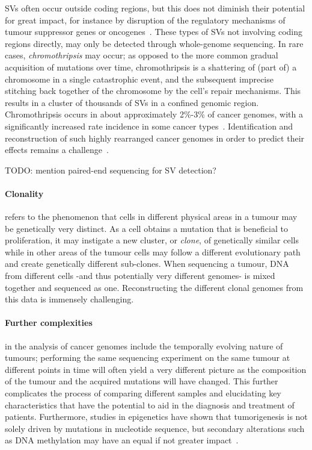 \begin{justify}
SVs often occur outside coding regions, but this does not diminish their potential for great impact, for instance by disruption of the regulatory mechanisms of tumour suppressor genes or oncogenes~\cite{TODO}. These types of SVs not involving coding regions directly, may only be detected through whole-genome sequencing. In rare cases, \emph{chromothripsis} may occur; as opposed to the more common gradual acquisition of mutations over time, chromothripsis is a shattering of (part of) a chromosome in a single catastrophic event, and the subsequent imprecise stitching back together of the chromosome by the cell's repair mechanisms. This results in a cluster of thousands of SVs in a confined genomic region. Chromothripsis occurs in about approximately 2\%-3\% of cancer genomes, with a significantly increased rate incidence in some cancer types~\cite{luijten2018}. Identification and reconstruction of such highly rearranged cancer genomes in order to predict their effects remains a challenge~\cite{yang2016chromothripsis,govind2014}.

TODO: mention paired-end sequencing for SV detection?



\paragraph{Clonality} refers to the phenomenon that cells in different physical areas in a tumour may be genetically very distinct. As a cell obtains a mutation that is beneficial to proliferation, it may instigate a new cluster, or \textit{clone}, of genetically similar cells while in other areas of the tumour cells may follow a different evolutionary path and create genetically different sub-clones. When sequencing a tumour, DNA from different cells -and thus potentially very different genomes- is mixed together and sequenced as one. Reconstructing the different clonal genomes from this data is immensely challenging.

\paragraph{Further complexities} in the analysis of cancer genomes include the temporally evolving nature of tumours; performing the same sequencing experiment on the same tumour at different points in time will often yield a very different picture as the composition of the tumour and the acquired mutations will have changed. This further complicates the process of comparing different samples and elucidating key characteristics that have the potential to aid in the diagnosis and treatment of patients. Furthermore, studies in epigenetics have shown that tumorigenesis is not solely driven by mutations in nucleotide sequence, but secondary alterations such as DNA methylation may have an equal if not greater impact~\cite{pacchierotti2015environmental}.


\end{justify}

